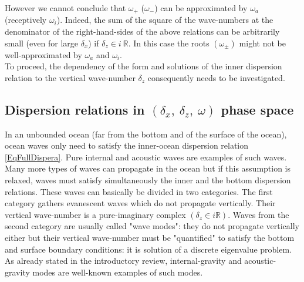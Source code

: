 \documentclass[a4paper,11pt]{article}
\begin{document}
However we cannot conclude that $\omega_+$ ($\omega_-$) can be approximated by $\omega_a$ (receptively $\omega_i$). Indeed, the sum of the square of the wave-numbers at the denominator of the right-hand-sides of the above relations can be arbitrarily small (even for large $\delta_x$) if $\delta_z\in i \ \mathbb{R}$. In this case the roots $(\omega_\pm)$ might not be well-approximated by $\omega_a$ and $\omega_i$.\\
To proceed, the dependency of the form and solutions of the inner dispersion relation to the vertical wave-number $\delta_z$ consequently needs to be investigated.

\subsection{Dispersion relations in $(\delta_x,\ \delta_z,\ \omega)$ phase space}
\label{SubSectionDispSurfIntro}

In an unbounded ocean (far from the bottom and of the surface of the ocean), ocean waves only need to satisfy the inner-ocean dispersion relation \ref{EqFullDispera}. Pure internal and acoustic waves are examples of such waves. Many more types of waves can propagate in the ocean but if this assumption is relaxed, waves must satisfy simultaneously the inner and the bottom dispersion relations. These waves can basically be divided in two categories. The first category gathers evanescent waves which do not propagate vertically. Their vertical wave-number is a pure-imaginary complex $(\delta_z\in i\mathbb{R})$. Waves from the second category are usually called "wave modes": they do not propagate vertically either but their vertical wave-number must be "quantified" to satisfy the bottom and surface boundary conditions: it is solution of a discrete eigenvalue problem. As already stated in the introductory review, internal-gravity and acoustic-gravity modes are well-known examples of such modes.\\
\end{document}

